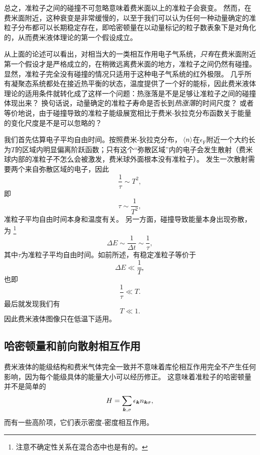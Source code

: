 总之，准粒子之间的碰撞不可忽略意味着费米面以上的准粒子会衰变。
然而，在费米面附近，这种衰变是非常缓慢的，以至于我们可以认为任何一种动量确定的准粒子分布都可以长期稳定存在，即哈密顿量在以动量标记的粒子数表象下是对角化的，从而费米液体理论的第一个假设成立。

从上面的论述可以看出，对相当大的一类相互作用电子气系统，\emph{只有}在费米面附近第一个假设才是严格成立的，在稍微远离费米面的地方，准粒子之间仍然有碰撞。
显然，准粒子完全没有碰撞的情况只适用于这种电子气系统的红外极限。
几乎所有凝聚态系统都处在接近热平衡的状态，温度提供了一个好的能标，因此费米液体理论的适用条件就转化成了这样一个问题：热涨落是不是足够让准粒子之间的碰撞体现出来？
换句话说，动量确定的准粒子寿命是否长到\emph{热涨落}的时间尺度？
或者等价地说，由于碰撞导致的准粒子能级展宽相比于费米-狄拉克分布函数关于能量的变化尺度是不是可以忽略的？

我们首先估算电子平均自由时间。按照费米-狄拉克分布，$\expval*{{n}}$在$\epsilon_\text{F}$附近一个大约长为$T$的区域内明显偏离阶跃函数；只有这个“弥散区域”内的电子会发生散射（费米球内部的准粒子不怎么会被激发，费米球外面根本没有准粒子）。
发生一次散射需要两个来自弥散区域的电子，因此
\[
    \frac{1}{\tau} \sim T^2,
\]
即
\begin{equation}
    \tau \sim \frac{1}{T^2},
\end{equation}
准粒子平均自由时间本身和温度有关。
另一方面，碰撞导致能量本身出现弥散，为%
\footnote{
    注意不确定性关系在混合态中也是有的。
}%
\[
    \Delta E \sim \frac{1}{\Delta t} \sim \frac{1}{\tau},
\]
其中$\tau$为准粒子平均自由时间。如前所述，有稳定准粒子等价于
\[
    \Delta E \ll \frac{1}{T},
\]
也即
\[
    \frac{1}{\tau} \ll T.
\]
最后就发现我们有
\begin{equation}
    T \ll 1.
\end{equation}
因此费米液体图像只在低温下适用。

\subsection{哈密顿量和前向散射相互作用}

费米液体的能级结构和费米气体完全一致并不意味着库伦相互作用完全不产生任何影响，因为每个能级具体的能量大小可以经历修正。
这意味着准粒子的哈密顿量并不是简单的
\[
    H = \sum_{\vb*{k}, \sigma} \epsilon_{\vb*{k}} n_{\vb*{k} \sigma},
\]
而有一些高阶项，它们表示密度-密度相互作用。

